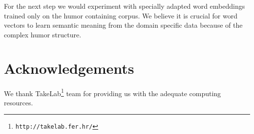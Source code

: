 \documentclass[10pt, a4paper]{article}
\begin{document}
For the next step we would experiment with specially adapted word embeddings
trained only on the humor containing corpus. We believe it is crucial for word
vectors to learn semantic meaning from the domain specific data because of the
complex humor structure. 

\section*{Acknowledgements}

We thank TakeLab\footnote{\texttt{http://takelab.fer.hr/}} team for providing
us with the adequate computing resources.


 
\end{document}
